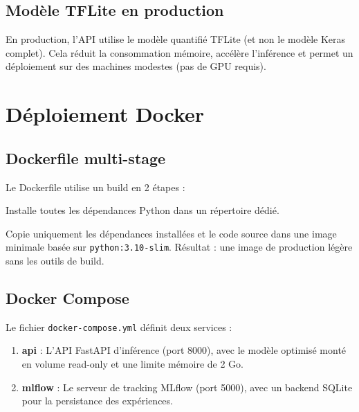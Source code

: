 ﻿\documentclass[11pt,a4paper]{article}
\begin{document}
\subsection{Modèle TFLite en production}

En production, l'API utilise le modèle quantifié TFLite (et non le modèle Keras complet). Cela réduit la consommation mémoire, accélère l'inférence et permet un déploiement sur des machines modestes (pas de GPU requis).

\section{Déploiement Docker}

\subsection{Dockerfile multi-stage}

Le Dockerfile utilise un build en 2 étapes :

\begin{description}[leftmargin=2em]
  \item[Stage 1 --- Builder] Installe toutes les dépendances Python dans un répertoire dédié.
  \item[Stage 2 --- Production] Copie uniquement les dépendances installées et le code source dans une image minimale basée sur \texttt{python:3.10-slim}. Résultat : une image de production légère sans les outils de build.
\end{description}

\subsection{Docker Compose}

Le fichier \texttt{docker-compose.yml} définit deux services :

\begin{enumerate}[leftmargin=2em]
  \item \textbf{api} : L'API FastAPI d'inférence (port 8000), avec le modèle optimisé monté en volume read-only et une limite mémoire de 2 Go.
  \item \textbf{mlflow} : Le serveur de tracking MLflow (port 5000), avec un backend SQLite pour la persistance des expériences.
\end{enumerate}
\end{document}
